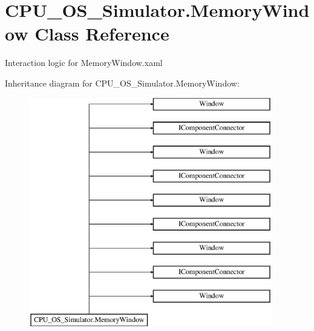 \hypertarget{class_c_p_u___o_s___simulator_1_1_memory_window}{}\section{C\+P\+U\+\_\+\+O\+S\+\_\+\+Simulator.\+Memory\+Window Class Reference}
\label{class_c_p_u___o_s___simulator_1_1_memory_window}


Interaction logic for Memory\+Window.\+xaml  


Inheritance diagram for C\+P\+U\+\_\+\+O\+S\+\_\+\+Simulator.\+Memory\+Window\+:\begin{figure}[H]
\begin{center}
\leavevmode
\includegraphics[height=10.000000cm]{class_c_p_u___o_s___simulator_1_1_memory_window}
\end{center}
\end{figure}
